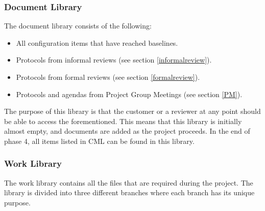 \documentclass{article}
\begin{document}
        \subsubsection{Document Library \label{doclibrary}} %
            The document library consists of the following:
            
            \begin{itemize}
                \item All configuration items that have reached baselines.
                \item Protocols from informal reviews (see section \ref{informalreview}).
                \item Protocols from formal reviews (see section \ref{formalreview}).
                \item Protocols and agendas from Project Group Meetings (see section \ref{PM}).
            \end{itemize}
            \noindent
            The purpose of this library is that the customer or a reviewer at any point should be able to access the forementioned. 
            This means that this library is initially almost empty, and documents are added as the project proceeds. In the end of phase 4, all items listed in CML can be found in this library.

        \subsubsection{Work Library}
            The work library contains all the files that are required during the project.
            The library is divided into three different branches where each branch has its unique purpose.
            
\end{document}
